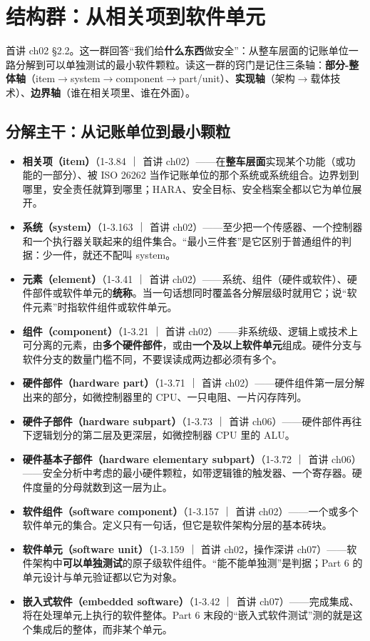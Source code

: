 \section{结构群：从相关项到软件单元}

\begin{noteblock}
首讲 ch02 §2.2。这一群回答“我们给\textbf{什么东西}做安全”：从整车层面的记账单位一路分解到可以单独测试的最小软件颗粒。读这一群的窍门是记住三条轴：\textbf{部分-整体轴}（item\(\rightarrow\)system\(\rightarrow\)component\(\rightarrow\)part/unit）、\textbf{实现轴}（架构\(\rightarrow\)载体技术）、\textbf{边界轴}（谁在相关项里、谁在外面）。
\end{noteblock}

\subsection{分解主干：从记账单位到最小颗粒}

\begin{itemize}
\item \textbf{相关项（item）}（1-3.84 ｜ 首讲 ch02）——在\textbf{整车层面}实现某个功能（或功能的一部分）、被 ISO 26262 当作记账单位的那个系统或系统组合。边界划到哪里，安全责任就算到哪里；HARA、安全目标、安全档案全都以它为单位展开。
\item \textbf{系统（system）}（1-3.163 ｜ 首讲 ch02）——至少把一个传感器、一个控制器和一个执行器关联起来的组件集合。“最小三件套”是它区别于普通组件的判据：少一件，就还不配叫 system。
\item \textbf{元素（element）}（1-3.41 ｜ 首讲 ch02）——系统、组件（硬件或软件）、硬件部件或软件单元的\textbf{统称}。当一句话想同时覆盖各分解层级时就用它；说“软件元素”时指软件组件或软件单元。
\item \textbf{组件（component）}（1-3.21 ｜ 首讲 ch02）——非系统级、逻辑上或技术上可分离的元素，由\textbf{多个硬件部件}，或由\textbf{一个及以上软件单元}组成。硬件分支与软件分支的数量门槛不同，不要误读成两边都必须有多个。
\item \textbf{硬件部件（hardware part）}（1-3.71 ｜ 首讲 ch02）——硬件组件第一层分解出来的部分，如微控制器里的 CPU、一只电阻、一片闪存阵列。
\item \textbf{硬件子部件（hardware subpart）}（1-3.73 ｜ 首讲 ch06）——硬件部件再往下逻辑划分的第二层及更深层，如微控制器 CPU 里的 ALU。
\item \textbf{硬件基本子部件（hardware elementary subpart）}（1-3.72 ｜ 首讲 ch06）——安全分析中考虑的最小硬件颗粒，如带逻辑锥的触发器、一个寄存器。硬件度量的分母就数到这一层为止。
\item \textbf{软件组件（software component）}（1-3.157 ｜ 首讲 ch02）——一个或多个软件单元的集合。定义只有一句话，但它是软件架构分层的基本砖块。
\item \textbf{软件单元（software unit）}（1-3.159 ｜ 首讲 ch02，操作深讲 ch07）——软件架构中\textbf{可以单独测试}的原子级软件组件。“能不能单独测”是判据；Part 6 的单元设计与单元验证都以它为对象。
\item \textbf{嵌入式软件（embedded software）}（1-3.42 ｜ 首讲 ch07）——完成集成、将在处理单元上执行的软件整体。Part 6 末段的“嵌入式软件测试”测的就是这个集成后的整体，而非某个单元。
\end{itemize}

